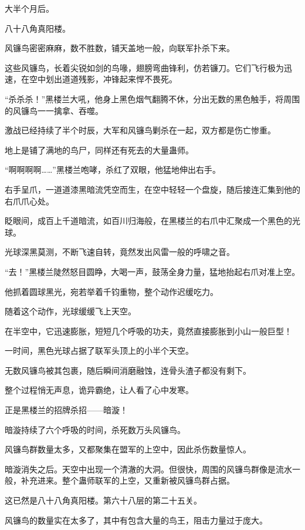
\begin{this_body}

大半个月后。

八十八角真阳楼。

风镰鸟密密麻麻，数不胜数，铺天盖地一般，向联军扑杀下来。

这些风镰鸟，长着尖锐如剑的鸟喙，翅膀弯曲锋利，仿若镰刀。它们飞行极为迅速，在空中划出道道残影，冲锋起来悍不畏死。

“杀杀杀！”黑楼兰大吼，他身上黑色烟气翻腾不休，分出无数的黑色触手，将周围的风镰鸟一一擒拿、吞噬。

激战已经持续了半个时辰，大军和风镰鸟剿杀在一起，双方都是伤亡惨重。

地上是铺了满地的鸟尸，同样还有死去的大量蛊师。

“啊啊啊啊……”黑楼兰咆哮，杀红了双眼，他猛地伸出右手。

右手呈爪，一道道漆黑暗流凭空而生，在空中轻轻一个盘旋，随后接连汇集到他的右爪爪心处。

眨眼间，成百上千道暗流，如百川归海般，在黑楼兰的右爪中汇聚成一个黑色的光球。

光球深黑莫测，不断飞速自转，竟然发出风雷一般的呼啸之音。

“去！”黑楼兰陡然怒目圆睁，大喝一声，鼓荡全身力量，猛地抬起右爪对准上空。

他抓着圆球黑光，宛若举着千钧重物，整个动作迟缓吃力。

随着这个动作，光球缓缓飞上天空。

在半空中，它迅速膨胀，短短几个呼吸的功夫，竟然直接膨胀到小山一般巨型！

一时间，黑色光球占据了联军头顶上的小半个天空。

无数风镰鸟被其包裹，随后瞬间消磨融蚀，连骨头渣子都没有剩下。

整个过程悄无声息，诡异霸绝，让人看了心中发寒。

正是黑楼兰的招牌杀招——暗漩！

暗漩持续了六个呼吸的时间，杀死数万头风镰鸟。

风镰鸟群数量太多，又都聚集在盟军的上空中，因此杀伤数量惊人。

暗漩消失之后。天空中出现一个清澈的大洞。但很快，周围的风镰鸟群像是流水一般，补充进来。整个蛊师联军的上空，又重新被风镰鸟群占据。

这已然是八十八角真阳楼。第六十八层的第二十五关。

风镰鸟的数量实在太多了，其中有包含大量的鸟王，阻击力量过于庞大。


\end{this_body}
